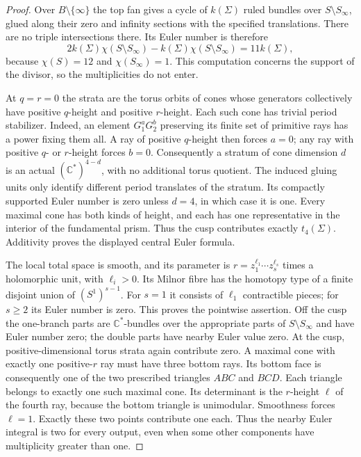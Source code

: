 \begin{proof}
Over $B\setminus\{\infty\}$ the top fan gives a cycle
of $k(\Sigma)$ ruled bundles over
$S\setminus S_\infty$, glued along their zero and
infinity sections with the specified translations.
There are no triple intersections there. Its Euler
number is therefore
\[
 2k(\Sigma)\chi(S\setminus S_\infty)
       -k(\Sigma)\chi(S\setminus S_\infty)
 =11k(\Sigma),
\]
because $\chi(S)=12$ and $\chi(S_\infty)=1$.
This computation concerns the support of the divisor,
so the multiplicities do not enter.

At $q=r=0$ the strata are the torus orbits of cones whose
generators collectively have positive $q$-height and
positive $r$-height. Each such cone has trivial period
stabilizer. Indeed, an element $G_1^aG_2^b$ preserving
its finite set of primitive rays has a power fixing them
all. A ray of positive $q$-height then forces $a=0$;
any ray with positive $q$- or $r$-height forces $b=0$.
Consequently a stratum of cone dimension $d$ is an actual
$(\mathbb C^*)^{4-d}$, with no additional torus quotient.
The induced gluing units only identify different period
translates of the stratum. Its compactly supported Euler
number is zero unless $d=4$, in which case it is one.
Every maximal cone has both kinds of height, and each has
one representative in the interior of the fundamental
prism. Thus the cusp contributes exactly $t_4(\Sigma)$.
Additivity proves the displayed central Euler formula.

The local total space is smooth, and its parameter is
$r=z_1^{\ell_1}\cdots z_s^{\ell_s}$ times a holomorphic
unit, with $\ell_i>0$. Its Milnor fibre has the homotopy
type of a finite disjoint union of $(S^1)^{s-1}$.
For $s=1$ it consists of $\ell_1$ contractible pieces;
for $s\geq2$ its Euler number is zero. This proves the
pointwise assertion. Off the cusp the one-branch parts
are $\mathbb C^*$-bundles over the appropriate parts of
$S\setminus S_\infty$ and have Euler number zero; the
double parts have nearby Euler value zero. At the cusp,
positive-dimensional torus strata again contribute zero.
A maximal cone with exactly one positive-$r$ ray must
have three bottom rays. Its bottom face is consequently
one of the two prescribed triangles $ABC$ and $BCD$.
Each triangle belongs to exactly one such maximal cone.
Its determinant is the $r$-height $\ell$ of the fourth
ray, because the bottom triangle is unimodular.
Smoothness forces $\ell=1$. Exactly these two points
contribute one each. Thus the nearby Euler integral is
two for every output, even when some other components
have multiplicity greater than one.


\end{proof}
